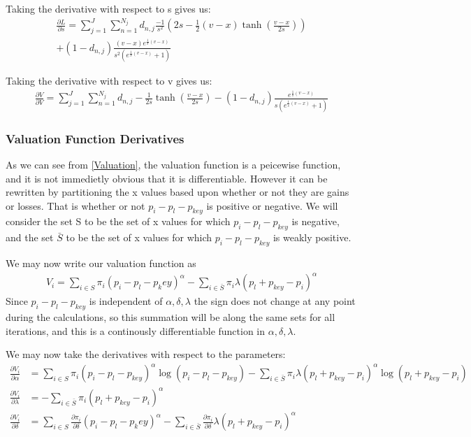\documentclass[11pt]{article}
\begin{document}
Taking the derivative with respect to s gives us:
\begin{align*}
\frac{ \partial L}{\partial s} = \sum_{j=1}^J \sum_{n=1}^{N_j} d_{n,j}  \frac{-1}{s^{2}} \left(2 s - \frac{1}{2} \left(v - x\right) \tanh{\left (\frac{v - x}{2 s} \right )}\right)\\
 + (1-d_{n,j}) \frac{\left(v - x\right) e^{\frac{1}{s} \left(v - x\right)}}{s^{2} \left(e^{\frac{1}{s} \left(v - x\right)} + 1\right)}
\end{align*}

Taking the derivative with respect to v gives us:
\begin{align*}
\frac{\partial V}{\partial V} = \sum_{j=1}^J \sum_{n=1}^{N_j} d_{n,j} - \frac{1}{2 s} \tanh{\left (\frac{v - x}{2 s} \right )} - (1-d_{n,j}) \frac{e^{\frac{1}{s} \left(v - x\right)}}{s \left(e^{\frac{1}{s} \left(v - x\right)} + 1\right)}
\end{align*}

\subsubsection{Valuation Function Derivatives}
\label{sec-4-3-2}

As we can see from \ref{Valuation}, the valuation function is a
peicewise function, and it is not immedietly obvious that it is
differentiable. However it can be rewritten by partitioning the x
values based upon whether or not they are gains or losses. That is
whether or not $p_i - p_l - p_{key}$ is positive or negative. We will
consider the set S to be the set of x values for which $p_i - p_l -
p_{key}$ is negative, and the set $\bar{S}$ to be the set of x values for
which $p_i - p_l - p_{key}$ is weakly positive.

We may now write our valuation function as 
\begin{align}
\label{diffValuation}
V_i = \sum_{i \in S} \pi_i (p_i - p_l - p_key)^\alpha - \sum_{i \in \bar{S}} \pi_i  \lambda ( p_l + p_{key} - p_i )^\alpha
\end{align}
Since $p_i - p_l - p_{key}$ is independent of $\alpha,\delta,\lambda$ the sign does not
change at any point during the calculations, so this summation will be
along the same sets for all iterations, and this is a continously
differentiable function in $\alpha,\delta,\lambda$. 

We may now take the derivatives with respect to the parameters:
\begin{align*}
\frac{\partial V_i}{\partial \alpha} &= \sum_{i \in S} \pi_i (p_i - p_l - p_{key} )^\alpha \log( p_i - p_l - p_{key}) - \sum_{i \in \bar{S}} \pi_i  \lambda ( p_l + p_{key} - p_i )^\alpha \log( p_l + p_{key} - p_i)\\
\frac{\partial V_i}{\partial \lambda} &=  - \sum_{i \in \bar{S}} \pi_i  ( p_l + p_{key} - p_i )^\alpha \\
\frac{\partial V_i}{\partial \delta} &= \sum_{i \in S} \frac{\partial \pi_i}{\partial \delta} (p_i - p_l - p_key)^\alpha - \sum_{i \in \bar{S}} \frac{ \partial \pi_i}{\partial \delta}  \lambda ( p_l + p_{key} - p_i )^\alpha 
\end{align*}
\end{document}
